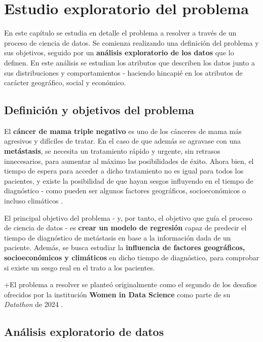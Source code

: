 \chapter{Estudio exploratorio del problema}

En este capítulo se estudia en detalle el problema a resolver a través de un proceso de ciencia de datos. Se comienza realizando una definición del problema y sus objetivos, seguido por un \textbf{análisis exploratorio de los datos} que lo definen. En este análisis se estudian los atributos que describen los datos junto a sus distribuciones y comportamientos - haciendo hincapié en los atributos de carácter geográfico, social y económico.

\section{Definición y objetivos del problema}

El \textbf{cáncer de mama triple negativo} es uno de los cánceres de mama más agresivos y difíciles de tratar. En el caso de que además se agravase con una \textbf{metástasis}, se necesita un tratamiento rápido y urgente, sin retrasos innecesarios, para aumentar al máximo las posibilidades de éxito. Ahora bien, el tiempo de espera para acceder a dicho tratamiento no es igual para todos los pacientes, y existe la posibilidad de que hayan sesgos influyendo en el tiempo de diagnóstico - como pueden ser algunos factores geográficos, socioeconómicos o incluso climáticos \cite{widsdatathon2024-challenge2}.

El principal objetivo del problema - y, por tanto, el objetivo que guía el proceso de ciencia de datos - es \textbf{crear un modelo de regresión} capaz de predecir el tiempo de diagnóstico de metástasis en base a la información dada de un paciente. Además, se busca estudiar la \textbf{influencia de factores geográficos, socioeconómicos y climáticos} en dicho tiempo de diagnóstico, para comprobar si existe un sesgo real en el trato a los pacientes.

+El problema a resolver se planteó originalmente como el segundo de los desafios ofrecidos por la institución \textbf{Women in Data Science} como parte de su \textit{Datathon} de 2024 \cite{widsdatathon2024-challenge2}.

\section{Análisis exploratorio de datos}

